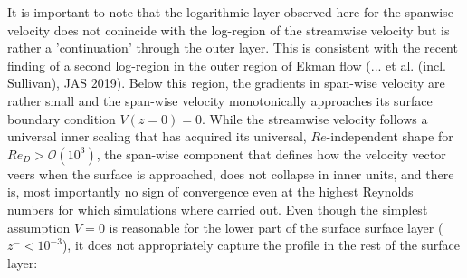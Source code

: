 \documentclass[a4paper,11pt]{amsart}
\begin{document}
%
%
 It is important to note that the logarithmic layer observed here for the spanwise velocity does not
conincide with the log-region of the streamwise velocity but is rather a 'continuation' through the outer layer.
%
This is consistent with the recent finding of a second log-region in the outer region of Ekman flow
(... et al. (incl. Sullivan), JAS 2019).
%
Below this region, the gradients in span-wise velocity are rather small and the span-wise velocity
monotonically approaches its surface boundary condition $V(z=0)=0$.
%
While the streamwise velocity follows a universal inner scaling that has acquired its universal, $Re$-independent shape for $Re_D> \mathcal{O}\left(10^3\right)$, the span-wise component that defines how the velocity vector veers when the surface is approached,
does not collapse in inner units, and there is, most importantly no sign of convergence even at the highest Reynolds numbers for
which simulations where carried out.
%
Even though the simplest assumption $V=0$ is reasonable for the lower part of the surface surface layer ($z^-<10^{-3}$), it does
not appropriately capture the profile in the rest of the surface layer:
\end{document}
